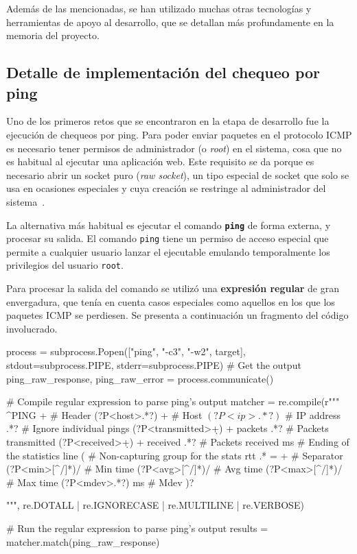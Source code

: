 \documentclass[a4paper,12pt]{article}
\begin{document}
Además de las mencionadas, se han utilizado muchas otras tecnologías y
herramientas de apoyo al desarrollo, que se detallan más profundamente en la
memoria del proyecto.

\subsection{Detalle de implementación del chequeo por ping}

Uno de los primeros retos que se encontraron en la etapa de desarrollo fue la
ejecución de chequeos por ping. Para poder enviar paquetes en el protocolo ICMP
es necesario tener permisos de administrador (o \textit{root}) en el sistema,
cosa que no es habitual al ejecutar una aplicación web. Este requisito se da
porque es necesario abrir un socket puro (\textit{raw socket}), un tipo especial
de socket que solo se usa en ocasiones especiales y cuya creación se restringe
al administrador del sistema~\cite{linux_man_capabilities}.

La alternativa más habitual es ejecutar el comando \textbf{\texttt{ping}} de
forma externa, y procesar su salida. El comando \texttt{ping} tiene un permiso
de acceso especial que permite a cualquier usuario lanzar el ejecutable emulando
temporalmente los privilegios del usuario \texttt{root}.

Para procesar la salida del comando se utilizó una \textbf{expresión regular} de
gran envergadura, que tenía en cuenta casos especiales como aquellos en los que
los paquetes ICMP se perdiesen. Se presenta a continuación un fragmento del
código involucrado.

\begin{pythoncode}
process = subprocess.Popen(["ping", "-c3", "-w2", target], 
                           stdout=subprocess.PIPE, 
                           stderr=subprocess.PIPE)
# Get the output
ping_raw_response, ping_raw_error = process.communicate()

# Compile regular expression to parse ping's output
matcher = re.compile(r"""
^PING \s+                            # Header
(?P<host>.*?) \s+                    # Host
\((?P<ip>.*?)\)                      # IP address
.*?                                  # Ignore individual pings
(?P<transmitted>\d+) \s+ packets       .*?       # Packets transmitted
(?P<received>\d+) \s+ received         .*?       # Packets received
ms                                     \s*       # Ending of the statistics line
(                                    # Non-capturing group for the stats
rtt .* = \s+                         # Separator
(?P<min>[^/]*)/                      # Min time
(?P<avg>[^/]*)/                      # Avg time
(?P<max>[^/]*)/                      # Max time
(?P<mdev>.*?) \s ms                  # Mdev
)?

""", re.DOTALL | re.IGNORECASE | re.MULTILINE | re.VERBOSE)

# Run the regular expression to parse ping's output
results = matcher.match(ping_raw_response)
\end{pythoncode}
\end{document}
